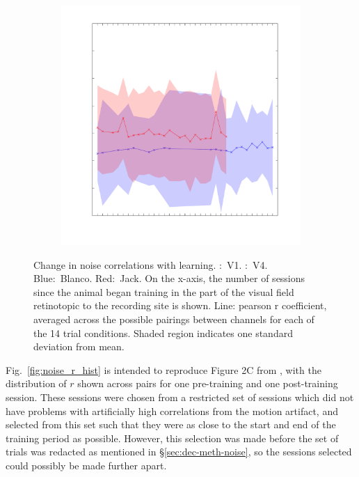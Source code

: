 \begin{figure}[htb]
\begin{subfigure}[b]{0.5\linewidth}
        \includegraphics[width=\linewidth]{./figures/ncl_decoding/rcoef_sess_meanpc_v4_both.pdf}
    \end{subfigure}
    \caption{Change in noise correlations with learning.
\protect{}:~V1.
\protect{}:~V4.
Blue:~Blanco.
Red:~Jack.
On the x-axis, the number of sessions since the animal began training in the part of the visual field retinotopic to the recording site is shown.
Line: pearson r coefficient, averaged across the possible pairings between channels for each of the 14 trial conditions.
Shaded region indicates one standard deviation from mean.
}
    \label{fig:noise_r_all}
\end{figure}

Fig.~\ref{fig:noise_r_hist} is intended to reproduce Figure 2C from \citet{Gu2011}, with the distribution of $r$ shown across pairs for one pre-training and one post-training session. These sessions were chosen from a restricted set of sessions which did not have problems with artificially high correlations from the motion artifact, and selected from this set such that they were as close to the start and end of the training period as possible. However, this selection was made before the set of trials was redacted as mentioned in \S\ref{sec:dec-meth-noise}, so the sessions selected could possibly be made further apart.


